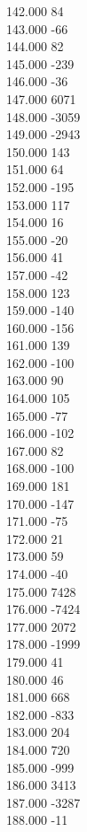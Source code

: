 { 142.000	84 \\
 143.000	-66 \\
 144.000	82 \\
 145.000	-239 \\
 146.000	-36 \\
 147.000	6071 \\
 148.000	-3059 \\
 149.000	-2943 \\
 150.000	143 \\
 151.000	64 \\
 152.000	-195 \\
 153.000	117 \\
 154.000	16 \\
 155.000	-20 \\
 156.000	41 \\
 157.000	-42 \\
 158.000	123 \\
 159.000	-140 \\
 160.000	-156 \\
 161.000	139 \\
 162.000	-100 \\
 163.000	90 \\
 164.000	105 \\
 165.000	-77 \\
 166.000	-102 \\
 167.000	82 \\
 168.000	-100 \\
 169.000	181 \\
 170.000	-147 \\
 171.000	-75 \\
 172.000	21 \\
 173.000	59 \\
 174.000	-40 \\
 175.000	7428 \\
 176.000	-7424 \\
 177.000	2072 \\
 178.000	-1999 \\
 179.000	41 \\
 180.000	46 \\
 181.000	668 \\
 182.000	-833 \\
 183.000	204 \\
 184.000	720 \\
 185.000	-999 \\
 186.000	3413 \\
 187.000	-3287 \\
 188.000	-11 \\
}
